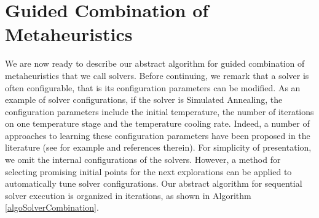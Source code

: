 \section{Guided Combination of Metaheuristics}
We are now ready to describe our abstract algorithm for guided combination of metaheuristics that we call solvers. Before continuing, we remark that a solver is often configurable, that is its configuration parameters can be modified. As an example of solver configurations, if the solver is Simulated Annealing, the configuration parameters include the initial temperature, the number of iterations on one temperature stage and the temperature cooling rate. Indeed, a number of approaches to learning these configuration parameters have been proposed in the literature (see for example \cite{HutHooLey11-smac} and references therein). For simplicity of presentation, we omit the internal configurations of the solvers. However, a method for selecting promising initial points for the next explorations can be applied to automatically tune solver configurations. Our abstract algorithm for sequential solver execution is organized in iterations, as shown in Algorithm \ref{algoSolverCombination}. 



